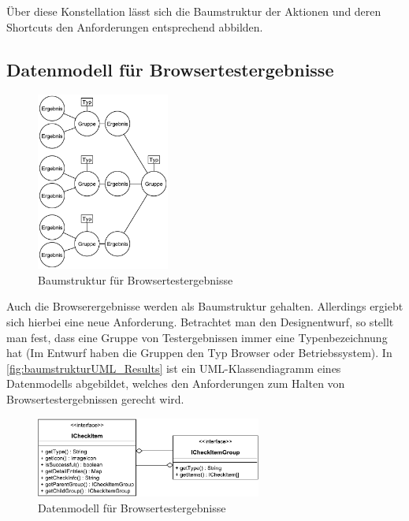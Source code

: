 Über diese Konstellation lässt sich die Baumstruktur der Aktionen und deren Shortcuts den Anforderungen entsprechend abbilden.

\newpage

\subsection{Datenmodell für Browsertestergebnisse}
\label{DatenmodellBrow}

\begin{figure}
	\includegraphics[width=165px]{../graphic/diagrams/Baumstruktur_Results/Baumstruktur}
	\caption{Baumstruktur für Browsertestergebnisse}
	\label{fig:baumstruktur_Result}
\end{figure}

Auch die Browserergebnisse werden als Baumstruktur gehalten. Allerdings ergiebt sich hierbei eine neue Anforderung. Betrachtet man den Designentwurf, so stellt man fest, dass eine Gruppe von Testergebnissen immer eine Typenbezeichnung hat (Im Entwurf haben die Gruppen den Typ \glqq Browser\grqq\xspace oder \glqq Betriebssystem\grqq). In \autoref{fig:baumstrukturUML_Results} ist ein UML-Klassendiagramm eines Datenmodells abgebildet, welches den Anforderungen zum Halten von Browsertestergebnissen gerecht wird.

\begin{figure}[H]
	\flushright
	\includegraphics[width=280px]{../graphic/diagrams/CD_Baumstruktur_Results/Baumstruktur}
	\captionsetup{width=235px, justification=raggedleft}
	\caption{Datenmodell für Browsertestergebnisse}
	\label{fig:baumstrukturUML_Results}
\end{figure}

